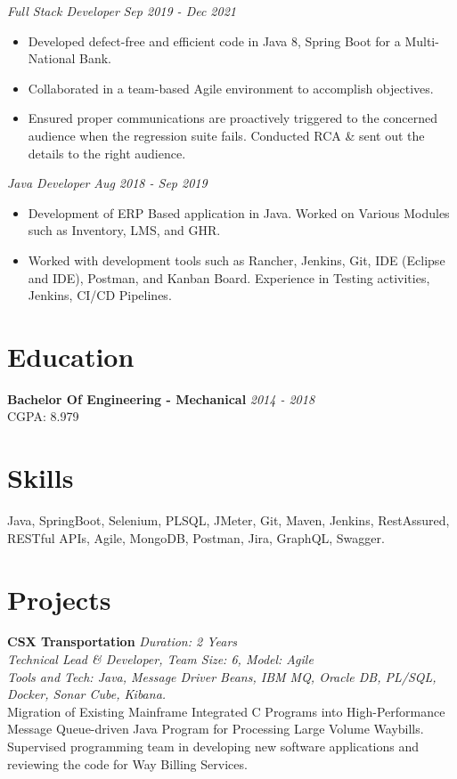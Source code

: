 \documentclass[a4paper,10pt]{article}
\begin{document}
\textit{Full Stack Developer} \hfill \textit{Sep 2019 - Dec 2021} \\
\begin{itemize}
    \item Developed defect-free and efficient code in Java 8, Spring Boot for a Multi-National Bank.
    \item Collaborated in a team-based Agile environment to accomplish objectives.
    \item Ensured proper communications are proactively triggered to the concerned audience when the regression suite fails. Conducted RCA \& sent out the details to the right audience.
\end{itemize}

\textit{Java Developer} \hfill \textit{Aug 2018 - Sep 2019} \\
\begin{itemize}
    \item Development of ERP Based application in Java. Worked on Various Modules such as Inventory, LMS, and GHR.
    \item Worked with development tools such as Rancher, Jenkins, Git, IDE (Eclipse and IDE), Postman, and Kanban Board. Experience in Testing activities, Jenkins, CI/CD Pipelines.
\end{itemize}

\section*{Education}

\textbf{Bachelor Of Engineering - Mechanical} \hfill \textit{2014 - 2018} \\
CGPA: 8.979

\section*{Skills}
Java, SpringBoot, Selenium, PLSQL, JMeter, Git, Maven, Jenkins, RestAssured, RESTful APIs, Agile, MongoDB, Postman, Jira, GraphQL, Swagger.

\section*{Projects}
\textbf{CSX Transportation} \hfill \textit{Duration: 2 Years} \\
\textit{Technical Lead \& Developer, Team Size: 6, Model: Agile} \\
\textit{Tools and Tech: Java, Message Driver Beans, IBM MQ, Oracle DB, PL/SQL, Docker, Sonar Cube, Kibana.} \\
Migration of Existing Mainframe Integrated C Programs into High-Performance Message Queue-driven Java Program for Processing Large Volume Waybills. Supervised programming team in developing new software applications and reviewing the code for Way Billing Services.
\end{document}
